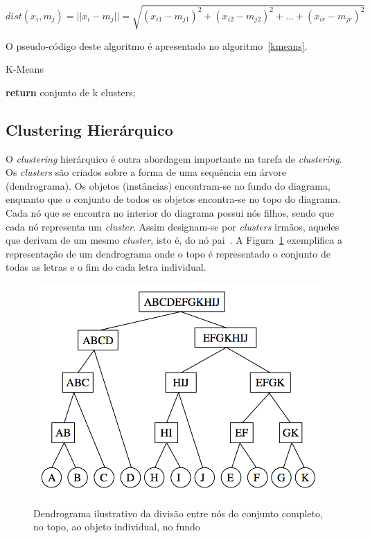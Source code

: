 \begin{equation}
dist(x_{i}, m_{j}) = ||x_{i} - m_{j}|| =  \sqrt{(x_{i1} - m_{j1})^2 + (x_{i2} - m_{j2})^2 + ... + (x_{ir} - m_{jr})^2}
\label{exemp:disteclid}
\end{equation}


O pseudo-código deste algoritmo é apresentado no algoritmo~\ref{kmeans}.

\begin{algorithm}
\caption{K-Means}\label{kmeans}
\begin{algorithmic}[1]
	\Repeat 
	\State \textbf{return} {conjunto de k clusters;}
\EndProcedure 
\end{algorithmic}
\end{algorithm}


\subsection{Clustering Hierárquico} \label{subsec:hierar}

O \textit{clustering} hierárquico é outra abordagem importante na tarefa de \textit{clustering}. Os \textit{clusters} são criados sobre a forma de uma sequência em árvore (dendrograma). Os objetos (instâncias) encontram-se no fundo do diagrama, enquanto que o conjunto de todos os objetos encontra-se no topo do diagrama. Cada nó que se encontra no interior do diagrama possui nós filhos, sendo que cada nó representa um \textit{cluster}. Assim designam-se por \textit{clusters} irmãos, aqueles que derivam de um mesmo \textit{cluster}, isto é, do nó pai~\citet{Liu2011}. A Figura~\ref{fig:hierarquico} exemplifica a representação de um dendrograma onde o topo é representado o conjunto de todas as letras e o fim do cada letra individual. 

\begin{figure}[h]
\centering
\includegraphics[width=0.6\linewidth]{./figures/hierarquico}
\caption{Dendrograma ilustrativo da divisão entre nós do conjunto completo, no topo, ao objeto individual, no fundo~\citet{Bramer2007}}
\label{fig:hierarquico}
\end{figure}

